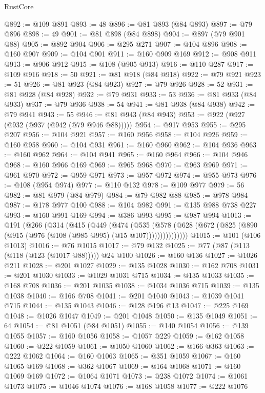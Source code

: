 \begin{lexlean}{RustCore}
\begin{coremodule}
@892 := @109 @891
@893 := 48
@896 := @81 @893 (@84 @893)
@897 := @79 @896
@898 := 49
@901 := @81 @898 (@84 @898)
@904 := @897 (@79 @901 @88)
@905 := @892 @904
@906 := @295 @271
@907 := @104 @896
@908 := @160 @907
@909 := @104 @901
@911 := @160 @909 @169
@912 := @908 @911
@913 := @906 @912
@915 := @108 (@905 @913)
@916 := @110 @287
@917 := @109 @916
@918 := 50
@921 := @81 @918 (@84 @918)
@922 := @79 @921
@923 := 51
@926 := @81 @923 (@84 @923)
@927 := @79 @926
@928 := 52
@931 := @81 @928 (@84 @928)
@932 := @79 @931
@933 := 53
@936 := @81 @933 (@84 @933)
@937 := @79 @936
@938 := 54
@941 := @81 @938 (@84 @938)
@942 := @79 @941
@943 := 55
@946 := @81 @943 (@84 @943)
@953 := @922 (@927 (@932 (@937 (@942 (@79 @946 @88)))))
@954 := @917 @953
@955 := @295 @207
@956 := @104 @921
@957 := @160 @956
@958 := @104 @926
@959 := @160 @958
@960 := @104 @931
@961 := @160 @960
@962 := @104 @936
@963 := @160 @962
@964 := @104 @941
@965 := @160 @964
@966 := @104 @946
@968 := @160 @966 @169
@969 := @965 @968
@970 := @963 @969
@971 := @961 @970
@972 := @959 @971
@973 := @957 @972
@974 := @955 @973
@976 := @108 (@954 @974)
@977 := @110 @132
@978 := @109 @977
@979 := 56
@982 := @81 @979 (@84 @979)
@984 := @79 @982 @88
@985 := @978 @984
@987 := @178 @977 @100
@988 := @104 @982
@991 := @135 @988 @738 @227
@993 := @160 @991 @169
@994 := @386 @993
@995 := @987 @994
@1013 := @191
    (@266
      (@314
        (@415
          (@449
            (@474
              (@535
                (@578 (@628 (@672 (@825 (@890 (@915 (@976 (@108 (@985 @995) (@15 @107)))))))))))))))
@1015 := @101 (@106 @1013)
@1016 := @76 @1015
@1017 := @79 @132
@1025 := @77 (@87 (@113 (@118 (@123 (@1017 @88))))) @24 @100
@1026 := @160 @136
@1027 := @1026 @211
@1028 := @201 @1027
@1029 := @135 @1028
@1030 := @162 @708
@1031 := @201 @1030
@1033 := @1029 @1031 @715
@1034 := @135 @1033
@1035 := @168 @708
@1036 := @201 @1035
@1038 := @1034 @1036 @715
@1039 := @135 @1038
@1040 := @166 @708
@1041 := @201 @1040
@1043 := @1039 @1041 @715
@1044 := @135 @1043
@1046 := @128 @196 @13
@1047 := @225 @169
@1048 := @1026 @1047
@1049 := @201 @1048
@1050 := @135 @1049
@1051 := 64
@1054 := @81 @1051 (@84 @1051)
@1055 := @140 @1054
@1056 := @139 @1055
@1057 := @160 @1056
@1058 := @1057 @229
@1059 := @162 @1058
@1060 := @222 @1059
@1061 := @1050 @1060
@1062 := @166 @363
@1063 := @222 @1062
@1064 := @160 @1063
@1065 := @351 @1059
@1067 := @160 @1065 @169
@1068 := @362 @1067
@1069 := @164 @1068
@1071 := @160 @1069 @169
@1072 := @1064 @1071
@1073 := @238 @1072
@1074 := @1061 @1073
@1075 := @1046 @1074
@1076 := @168 @1058
@1077 := @222 @1076

\end{coremodule}
\end{lexlean}
